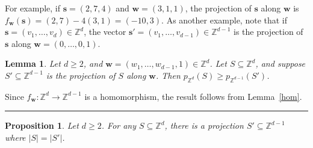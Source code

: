 \documentclass[12pt]{article}
\newenvironment{proof}{{\bf Proof:  }}{\hfill\rule{2mm}{2mm}}
\newtheorem{lemma}[theorem]{Lemma}
\newtheorem{proposition}[theorem]{Proposition}
\newcommand{\Z}{\ensuremath{\mathbb Z}}
\newcommand{\vect}[1]{\bm{#1}}
\begin{document}
  
  
For example, if $\vect{s}=(2,7,4)$ and $\vect{w} = (3,1,1)$, the projection of $\vect{s}$ along $\vect{w}$ is $f_{\vect{w}}(\vect{s}) = (2,7) - 4(3,1)= (-10,3)$. As another example, note that if $\vect{s}=(v_1, \ldots, v_d) \in \Z^d$, the vector $\vect{s}' = (v_1, \ldots, v_{d-1}) \in \Z^{d-1}$ is the projection of $\vect{s}$ along $\vect{w}= (0,\ldots, 0,1)$.

\begin{lemma}\label{proj}
Let $d \ge 2$, and $\vect{w}=(w_1,\ldots, w_{d-1},1) \in \Z^d$. Let $S \subseteq \Z^d$, and suppose $S' \subseteq \Z^{d-1}$ is the projection of $S$ along $\vect{w}$.  Then $p_{\Z^d}(S) \ge p_{\Z^{d-1}}(S')$.
\end{lemma}
\begin{proof}
Since $f_{\vect{w}}: \Z^d \to \Z^{d-1}$ is a homomorphism, the result follows from Lemma~\ref{hom}.
\end{proof}

\begin{proposition}\label{fullcard}
Let $d \ge 2$. For any $S\subseteq \Z^d$, there is a projection $S' \subseteq \Z^{d-1}$ where $|S|=|S'|$.
\end{proposition}
\end{document}
